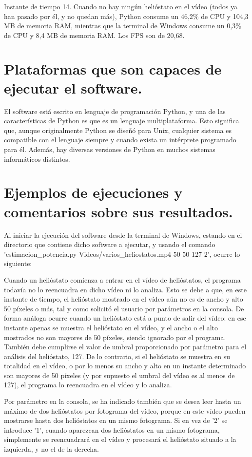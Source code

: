 \documentclass[12pt]{article}
\begin{document}
Instante de tiempo 14. Cuando no hay ningún helióstato en el vídeo (todos ya han pasado por él, y no quedan más), Python consume un 46,2\% de CPU y 104,3 MB de memoria RAM, mientras que la terminal de Windows consume un 0,3\% de CPU y 8,4 MB de memoria RAM. Los FPS son de 20,68.

\section{Plataformas que son capaces de ejecutar el software.}

El software está escrito en lenguaje de programación Python, y una de las características de Python es que es un lenguaje multiplataforma. Esto significa que, aunque originalmente Python se diseñó para Unix, cualquier sistema es compatible con el lenguaje siempre y cuando exista un intérprete programado para él. Además, hay diversas versiones de Python en muchos sistemas informáticos distintos.

\section{Ejemplos de ejecuciones y comentarios sobre sus resultados.}

Al iniciar la ejecución del software desde la terminal de Windows, estando en el directorio que contiene dicho software a ejecutar, y usando el comando 'estimacion\_potencia.py Videos/varios\_heliostatos.mp4 50 50 127 2', ocurre lo siguiente:

Cuando un helióstato comienza a entrar en el vídeo de helióstatos, el programa todavía no lo reencuadra en dicho vídeo ni lo analiza. Esto se debe a que, en este instante de tiempo, el helióstato mostrado en el vídeo aún no es de ancho y alto 50 píxeles o más, tal y como solicitó el usuario por parámetros en la consola. De forma análoga ocurre cuando un helióstato está a punto de salir del vídeo: en ese instante apenas se muestra el helióstato en el vídeo, y el ancho o el alto mostrados no son mayores de 50 píxeles, siendo ignorado por el programa. También debe cumplirse el valor de umbral proporcionado por parámetro para el análisis del helióstato, 127. De lo contrario, si el helióstato se muestra en su totalidad en el vídeo, o por lo menos su ancho y alto en un instante determinado son mayores de 50 píxeles (y por supuesto el umbral del vídeo es al menos de 127), el programa lo reencuadra en el vídeo y lo analiza.

Por parámetro en la consola, se ha indicado también que se desea leer hasta un máximo de dos helióstatos por fotograma del vídeo, porque en este vídeo pueden mostrarse hasta dos helióstatos en un mismo fotograma. Si en vez de '2' se introduce '1', cuando aparezcan dos helióstatos en un mismo fotograma, simplemente se reencuadrará en el vídeo y procesará el helióstato situado a la izquierda, y no el de la derecha.
\end{document}
